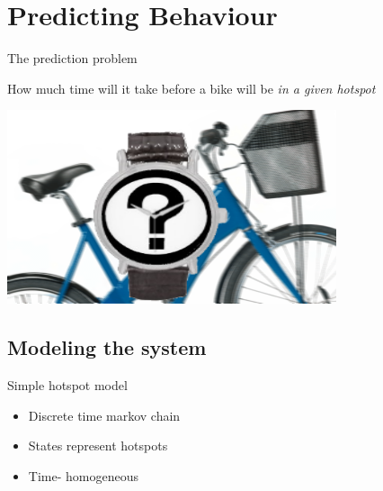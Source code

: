 \section{Predicting Behaviour}
\begin{frame}{The prediction problem}
\begin{center}
How much time will it take before a bike will be \emph{in a given hotspot}

\includegraphics[width=0.8\linewidth]{graphics/biketime}
\end{center}

\end{frame}

\subsection{Modeling the system}

\begin{frame}{Simple hotspot model}
\begin{center}


\begin{itemize}
	\item Discrete time markov chain
	\item States represent hotspots
	\item Time- homogeneous
\end{itemize}
\end{center}
\end{frame}

